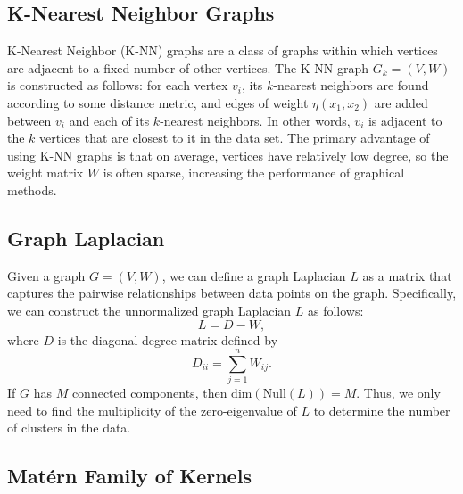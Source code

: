 \documentclass[12pt]{amsart}
\begin{document}
\subsection{K-Nearest Neighbor Graphs}
K-Nearest Neighbor (K-NN) graphs are a class of graphs within which vertices are adjacent to a fixed number of other vertices. The K-NN graph $G_k = (V, W)$ is constructed as follows: for each vertex $v_i$, its $k$-nearest neighbors are found according to some distance metric, and edges of weight $\eta(x_1,x_2)$ are added between $v_i$ and each of its $k$-nearest neighbors. In other words, $v_i$ is adjacent to the $k$ vertices that are closest to it in the data set. The primary advantage of using K-NN graphs is that on average, vertices have relatively low degree, so the weight matrix $W$ is often sparse, increasing the performance of graphical methods.

\subsection{Graph Laplacian}
Given a graph $G = (V, W)$, we can define a graph Laplacian $L$ as a matrix that captures the pairwise relationships between data points on the graph. Specifically, we can construct the unnormalized graph Laplacian $L$ as follows:
$$ L = D - W, $$
where $D$ is the diagonal degree matrix defined by
\[D_{ii} = \sum_{j = 1}^n W_{ij}.\]
If $G$ has $M$ connected components, then $\mathrm{dim}(\mathrm{Null}(L))=M$. Thus, we only need to find the multiplicity of the zero-eigenvalue of $L$ to determine the number of clusters in the data.

\subsection{Mat\'{e}rn Family of Kernels}
\end{document}
